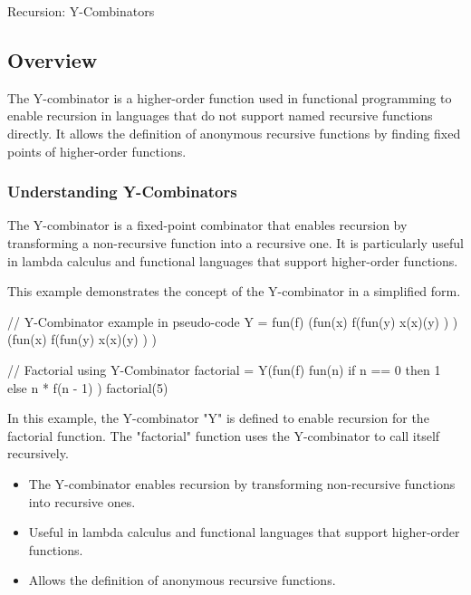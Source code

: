 \begin{notes}{Recursion: Y-Combinators}
    \subsection*{Overview}

    The Y-combinator is a higher-order function used in functional programming to enable recursion in languages that do not support named recursive functions directly. It allows the definition of anonymous recursive functions by finding fixed points of higher-order functions.
    
    \subsubsection*{Understanding Y-Combinators}
    
    The Y-combinator is a fixed-point combinator that enables recursion by transforming a non-recursive function into a recursive one. It is particularly useful in lambda calculus and functional languages that support higher-order functions.
    
    \begin{highlight}
    
        This example demonstrates the concept of the Y-combinator in a simplified form.
    
    \begin{code}[Lettuce]
    // Y-Combinator example in pseudo-code
    Y = fun(f) {
        (fun(x) { f(fun(y) { x(x)(y) }) })(fun(x) { f(fun(y) { x(x)(y) }) })
    }
    
    // Factorial using Y-Combinator
    factorial = Y(fun(f) {
        fun(n) {
            if n == 0 then 1 else n * f(n - 1)
        }
    })
    factorial(5)
    \end{code}
    
        In this example, the Y-combinator "Y" is defined to enable recursion for the factorial function. The "factorial" function uses the Y-combinator to call itself recursively.
    
        \begin{itemize}
            \item The Y-combinator enables recursion by transforming non-recursive functions into recursive ones.
            \item Useful in lambda calculus and functional languages that support higher-order functions.
            \item Allows the definition of anonymous recursive functions.
        \end{itemize}
    

\end{highlight}
\end{notes}
